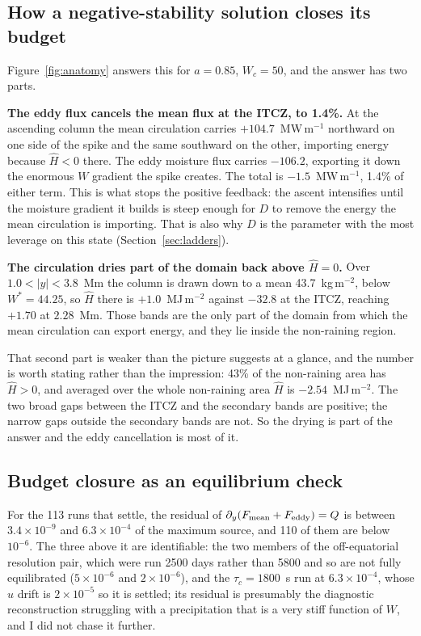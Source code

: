 \documentclass[11pt]{article}
\newcommand{\Hhat}{\hat{H}}
\newcommand{\Wstar}{W^{*}}
\newcommand{\py}{\partial_y}
\begin{document}
\subsection{How a negative-stability solution closes its budget}

Figure~\ref{fig:anatomy} answers this for $a = 0.85$, $W_c = 50$, and the answer
has two parts.

\textbf{The eddy flux cancels the mean flux at the ITCZ, to 1.4\%.} At the
ascending column the mean circulation carries $+104.7$~MW\,m$^{-1}$ northward on
one side of the spike and the same southward on the other, importing energy
because $\Hhat < 0$ there. The eddy moisture flux carries $-106.2$, exporting it
down the enormous $W$ gradient the spike creates. The total is
$-1.5$~MW\,m$^{-1}$, 1.4\% of either term. This is what stops the positive
feedback: the ascent intensifies until the moisture gradient it builds is steep
enough for $D$ to remove the energy the mean circulation is importing. That is
also why $D$ is the parameter with the most leverage on this state
(Section~\ref{sec:ladders}).

\textbf{The circulation dries part of the domain back above $\Hhat = 0$.} Over
$1.0 < |y| < 3.8$~Mm the column is drawn down to a mean 43.7~kg\,m$^{-2}$,
below $\Wstar = 44.25$, so $\Hhat$ there is $+1.0$~MJ\,m$^{-2}$ against $-32.8$
at the ITCZ, reaching $+1.70$ at $2.28$~Mm. Those bands are the only part of the
domain from which the mean circulation can export energy, and they lie inside
the non-raining region.

That second part is weaker than the picture suggests at a glance, and the number
is worth stating rather than the impression: 43\% of the non-raining area has
$\Hhat > 0$, and averaged over the whole non-raining area $\Hhat$ is
$-2.54$~MJ\,m$^{-2}$. The two broad gaps between the ITCZ and the secondary
bands are positive; the narrow gaps outside the secondary bands are not. So the
drying is part of the answer and the eddy cancellation is most of it.

\subsection{Budget closure as an equilibrium check}

For the 113 runs that settle, the residual of
$\py(F_{\rm mean} + F_{\rm eddy}) = Q$ is between $3.4\times10^{-9}$ and
$6.3\times10^{-4}$ of the maximum source, and 110 of them are below $10^{-6}$.
The three above it are identifiable: the two members of the off-equatorial
resolution pair, which were run 2500 days rather than 5800 and so are not fully
equilibrated ($5\times10^{-6}$ and $2\times10^{-6}$), and the $\tau_c = 1800$~s
run at $6.3\times10^{-4}$, whose $u$ drift is $2\times10^{-5}$ so it is settled;
its residual is presumably the diagnostic reconstruction struggling with a
precipitation that is a very stiff function of $W$, and I did not chase it
further.
\end{document}
